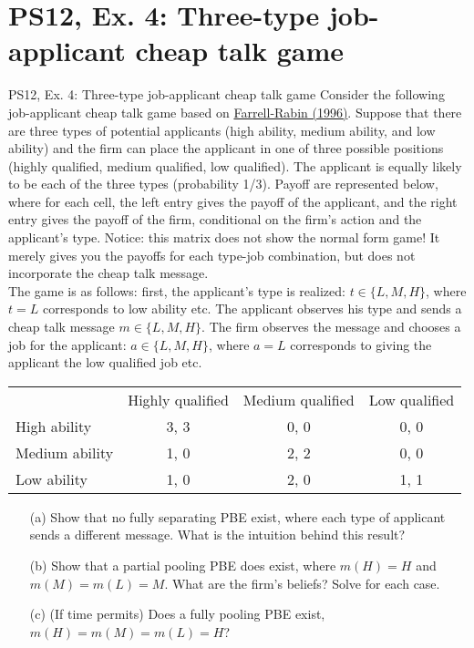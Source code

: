 \section{PS12, Ex. 4: Three-type job-applicant cheap talk game}

\begin{frame}{PS12, Ex. 4: Three-type job-applicant cheap talk game}
    Consider the following job-applicant cheap talk game based on \href{https://www.aeaweb.org/articles?id=10.1257/jep.10.3.103}{Farrell-Rabin (1996)}. Suppose that there are three types of potential applicants (high ability, medium ability, and low ability) and the firm can place the applicant in one of three possible positions (highly qualified, medium qualified, low qualified). The applicant is equally likely to be each of the three types (probability 1/3). Payoff are represented below, where for each cell, the left entry gives the payoff of the applicant, and the right entry gives the payoff of the firm, conditional on the firm’s action and the applicant’s type. Notice: this matrix does not show the normal form game! It merely gives you the payoffs for each type-job combination, but does not incorporate the cheap talk message.\\
    The game is as follows: first, the applicant’s type is realized: $t\in\{L,M,H\}$, where $t=L$ corresponds to low ability etc. The applicant observes his type and sends a cheap talk message $m\in\{L,M,H\}$. The firm observes the message and chooses a job for the applicant: $a\in\{L,M,H\}$, where $a=L$ corresponds to giving the applicant the low qualified job etc.\vspace{-14pt}
    \begin{table}
      \begin{tabular}{l|c|c|c|}
          \multicolumn{1}{c}{} & \multicolumn{1}{c}{Highly qualified} & \multicolumn{1}{c}{Medium qualified} & \multicolumn{1}{c}{Low qualified} \\\cline{2-4}
          High ability   & 3, 3 & 0, 0 & 0, 0 \\\cline{2-4}
          Medium ability & 1, 0 & 2, 2 & 0, 0 \\\cline{2-4}
          Low ability    & 1, 0 & 2, 0 & 1, 1 \\\cline{2-4}
      \end{tabular}
    \end{table}\vspace{-8pt}
    \begin{itemize}
      \item[(a)] Show that no fully separating PBE exist, where each type of applicant sends a different message. What is the intuition behind this result?
      \item[(b)] Show that a partial pooling PBE does exist, where $m(H)=H$ and $m(M)=m(L)=M$. What are the firm's beliefs? Solve for each case.
      \item[(c)] (If time permits) Does a fully pooling PBE exist, $m(H)=m(M)=m(L)=H$?
    \end{itemize}\vspace{-6pt}
    \vfill\null
\end{frame}



